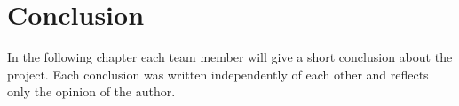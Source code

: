 \chapter{Conclusion}
In the following chapter each team member will give a short conclusion about the project. Each conclusion was written independently of each other and reflects only the opinion of the author.
